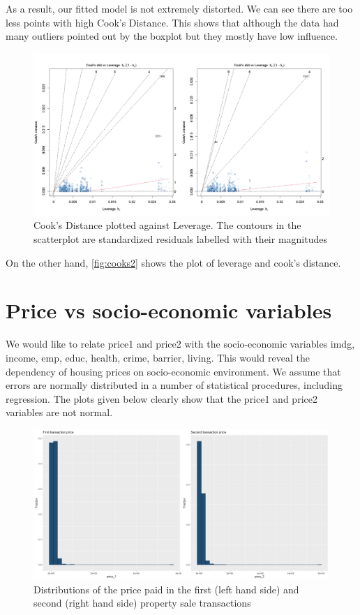 \documentclass[12pt]{article}
\begin{document}
As a result, our fitted model is not extremely distorted. We can see there are too less points with high Cook’s Distance. This shows that although the data had many outliers pointed out by the boxplot but they mostly have low influence.
\begin{figure}[H]
    \centering
    \includegraphics[width=18cm]{3.3 images/3.3.4.1.png}
    \caption{Cook's Distance plotted against Leverage. The contours in the scatterplot are standardized residuals labelled with their magnitudes}
    \label{fig:cooks2}
\end{figure}
On the other hand, \autoref{fig:cooks2} shows the plot of leverage and cook’s distance.

\section{Price vs socio-economic variables}
\label{sec:pvsse}
We would like to relate \gls{price1} and \gls{price2} with the socio-economic variables \gls{imdg}, \gls{income}, \gls{emp}, \gls{educ}, \gls{health}, \gls{crime}, \gls{barrier}, \gls{living}. This would reveal the dependency of housing prices on socio-economic environment.
We assume that errors are normally distributed in a number of statistical procedures, including regression. The plots given below clearly show that the \gls{price1} and \gls{price2} variables are not normal.

\begin{figure}[H]
    \centering
    \includegraphics[width=18cm]{4. price vs socio-eco images/4non-normalplots.png}
    \caption{Distributions of the price paid in the first (left hand side) and second (right hand side) property sale transactions}
    \label{fig:prices}
\end{figure}
\end{document}
